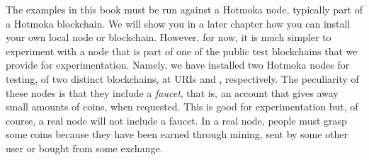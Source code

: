 The examples in this book must be run against a Hotmoka node,
typically part of a Hotmoka blockchain. We will show you in a later chapter how you
can install your own local
node or blockchain. However, for now, it is much simpler to experiment with a node
that is part of one of the public
test blockchains that we provide for experimentation.
Namely, we have installed two Hotmoka nodes for testing, of two distinct blockchains, at URIs
\serverMokamint{} and \serverTendermint{}, respectively.
The peculiarity of these nodes is that they include a \emph{faucet}, that is,
an account that gives
away small amounts of coins, when requested. This is good for experimentation
but, of course, a real node will not include a faucet.
In a real node, people must grasp some coins because they have been earned through mining,
sent by some other user or bought from some exchange.

